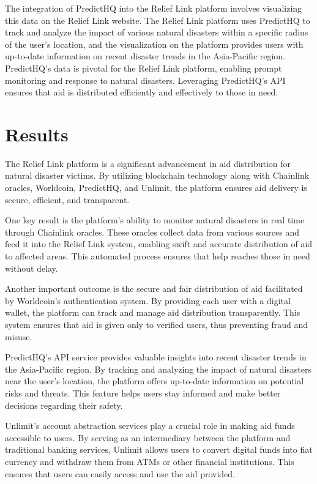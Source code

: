 \documentclass[conference]{IEEEtran}
\begin{document}
The integration of PredictHQ into the Relief Link platform involves visualizing this data on the Relief Link website. The Relief Link platform uses PredictHQ to track and analyze the impact of various natural disasters within a specific radius of the user's location, and the visualization on the platform provides users with up-to-date information on recent disaster trends in the Asia-Pacific region. PredictHQ's data is pivotal for the Relief Link platform, enabling prompt monitoring and response to natural disasters. Leveraging PredictHQ's API ensures that aid is distributed efficiently and effectively to those in need.

\section{Results}
The Relief Link platform is a significant advancement in aid distribution for natural disaster victims. By utilizing blockchain technology along with Chainlink oracles, Worldcoin, PredictHQ, and Unlimit, the platform ensures aid delivery is secure, efficient, and transparent.

One key result is the platform's ability to monitor natural disasters in real time through Chainlink oracles. These oracles collect data from various sources and feed it into the Relief Link system, enabling swift and accurate distribution of aid to affected areas. This automated process ensures that help reaches those in need without delay.

Another important outcome is the secure and fair distribution of aid facilitated by Worldcoin's authentication system. By providing each user with a digital wallet, the platform can track and manage aid distribution transparently. This system ensures that aid is given only to verified users, thus preventing fraud and misuse.

PredictHQ's API service provides valuable insights into recent disaster trends in the Asia-Pacific region. By tracking and analyzing the impact of natural disasters near the user's location, the platform offers up-to-date information on potential risks and threats. This feature helps users stay informed and make better decisions regarding their safety.

Unlimit's account abstraction services play a crucial role in making aid funds accessible to users. By serving as an intermediary between the platform and traditional banking services, Unlimit allows users to convert digital funds into fiat currency and withdraw them from ATMs or other financial institutions. This ensures that users can easily access and use the aid provided.
\end{document}
